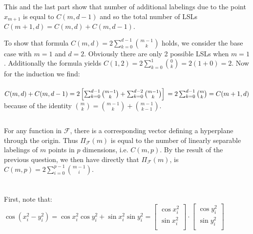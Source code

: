 \documentclass[]{article}
\begin{document}
This and the last part show that number of additional labelings due to the point $x_{m+1}$ is equal to $C(m, d-1)$ and so the total number of LSLs $C(m+1,d)=C(m,d)+C(m,d-1)$.

To show that formula $C(m,d) = 2\sum_{k=0}^{d-1}\binom{m-1}{k}$ holds, we consider the base case with $m=1$ and $d=2$. Obviously there are only 2 possible LSLs when $m=1$. Additionally the formula yields $C(1,2) = 2\sum_{k=0}^{1}\binom{0}{k}= 2(1 + 0) = 2$. Now for the induction we find:\\\\
$
C(m,d) + C(m, d-1) = 2\left[\sum_{k=0}^{d-1}\binom{m-1}{k}+\sum_{k=0}^{d-2}\binom{m-1}{k}\right]\\\\
=2\sum_{k=0}^{d-1}\binom{m}{k} = C(m+1,d)
$\\

\noindent because of the identity $\binom{m}{k} = \binom{m-1}{k} + \binom{m-1}{k-1}$.

\subsection{}
For any function in $\mathcal{F}$, there is a corresponding vector defining a hyperplane through the origin. Thus $\Pi_{\mathcal{F}}(m)$ is equal to the number of linearly separable labelings of $m$ points in $p$ dimensions, i.e. $C(m,p)$. By the result of the previous question, we then have directly that $\Pi_{\mathcal{F}}(m)$, is $C(m,p) = 2\sum_{i=0}^{p-1}\binom{m-1}{i}$.
\pagebreak

\section{}

\pagebreak

\section{}

\subsection{}

First, note that:\\ $\cos(x_i^2-y_i^2) = \cos x_i^2 \cos y_i^2 + \sin x_i^2 \sin y_i^2 
= \left[
\begin{array}{c}
\cos x_i^2\\
\sin x_i^2\\
\end{array}
\right]
\cdot
\left[
\begin{array}{c}
\cos y_i^2\\
\sin y_i^2\\
\end{array}
\right]$\\
\end{document}
